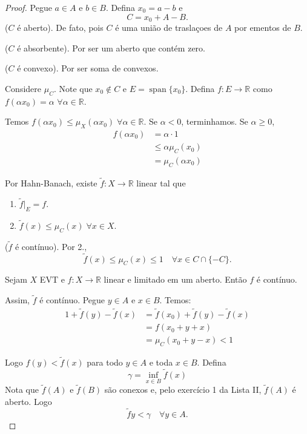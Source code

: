 \documentclass[portuguese]{article}
\theoremstyle{definition}
\newcommand{\R}{\mathbb{R}}
\begin{document}
	\begin{proof}
		Pegue $a\in A$ e $b\in B$. Defina $x_0=a-b$ e 
		\[C=x_0+A-B.\]
		($C$ é aberto). De fato, pois $C$ é uma união de traslaçoes de $A$ por ementos de $B$.
		
		($C$ é absorbente). Por ser um aberto que contém zero.
		
		($C$ é convexo). Por ser soma de convexos.
		
		Considere $\mu_C$. Note que $x_0\notin C$ e $E=\operatorname{span}\{x_0\}$. Defina $f:E\to\R$ como $f(\alpha x_0)=\alpha$ $\forall \alpha\in\R$.
		
		Temos $f(\alpha x_0)\leq\mu_X(\alpha x_0)\;\forall\alpha\in\R$. Se $\alpha<0$, terminhamos. Se $\alpha\geq0$, 
		\begin{align*}
			f(\alpha x_0)&=\alpha\cdot1\\
			&\leq\alpha\mu_C(x_0)\\
			&=\mu_C(\alpha x_0)
		\end{align*}
		
		Por Hahn-Banach, existe $\tilde{f}:X\to\R$ linear tal que
		\begin{enumerate}
			\item $\tilde{f}|_E=f$.
			\item $\tilde{f}(x)\leq\mu_C(x)\;\forall x\in X$.
		\end{enumerate}
		
		($\tilde{f}$ é contínuo). Por 2., 
		\[\tilde{f}(x)\leq\mu_C(x)\leq1\quad\forall x\in C\cap\{-C\}.\]
		\begin{exer*}
			Sejam $X$ EVT e $f:X\to\R$ linear e limitado em um aberto. Então $f$ é contínuo.
		\end{exer*}
		Assim, $\tilde{f}$ é contínuo. Pegue $y\in A$ e $x\in B$. Temos:
		\begin{align*}
			1+\tilde{f}(y)-\tilde{f}(x)&=\tilde{f}(x_0)+\tilde{f}(y)-\tilde{f}(x)\\
			&=f(x_0+y+x)\\
			&=\mu_C(x_0+y-x)<1
		\end{align*}
		
		Logo $f(y)<\tilde{f}(x)$ para todo $y\in A$ e toda $x\in B$. Defina
		\[\gamma=\inf_{x\in B}\tilde{f}(x)\]
		Nota que $\tilde{f}(A)$ e $\tilde{f}(B)$ são conexos e, pelo exercício 1 da Lista II, $\tilde{f}(A)$ é aberto. Logo
		\[\tilde{f}y<\gamma\quad\forall y\in A.\]
	\end{proof}
	
\end{document}

